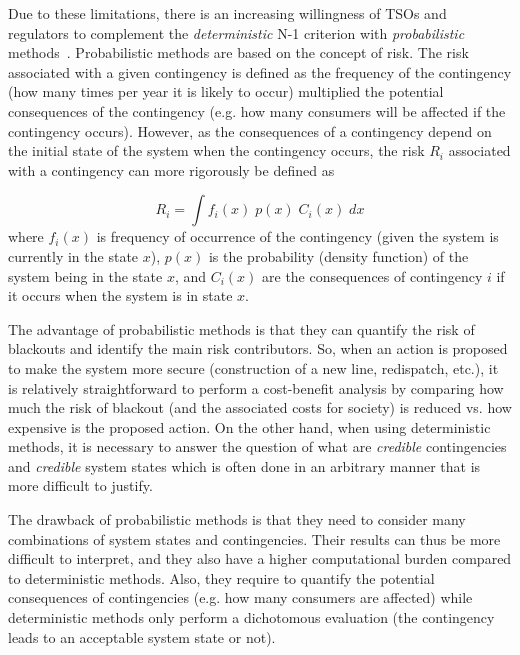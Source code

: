 Due to these limitations, there is an increasing willingness of TSOs and regulators to complement the \emph{deterministic} N-1 criterion with \emph{probabilistic} methods~\cite{ACER}. Probabilistic methods are based on the concept of risk. The risk associated with a given contingency is defined as the frequency of the contingency (how many times per year it is likely to occur) multiplied the potential consequences of the contingency (e.g. how many consumers will be affected if the contingency occurs). However, as the consequences of a contingency depend on the initial state of the system when the contingency occurs, the risk \(R_i\) associated with a contingency can more rigorously be defined as

\begin{equation}
    \label{eq:risk}
    {R_i = \int f_i(x) \; p(x) \; C_i(x) \; dx}
\end{equation}
\noindent where \(f_i(x)\) is frequency of occurrence of the contingency (given the system is currently in the state \(x\)), \(p(x)\) is the probability (density function) of the system being in the state \(x\), and \(C_i(x)\) are the consequences of contingency \(i\) if it occurs when the system is in state \(x\).

The advantage of probabilistic methods is that they can quantify the risk of blackouts and identify the main risk contributors. So, when an action is proposed to make the system more secure (construction of a new line, redispatch, etc.), it is relatively straightforward to perform a cost-benefit analysis by comparing how much the risk of blackout (and the associated costs for society) is reduced vs. how expensive is the proposed action. On the other hand, when using deterministic methods, it is necessary to answer the question of what are \emph{credible} contingencies and \emph{credible} system states which is often done in an arbitrary manner that is more difficult to justify.

The drawback of probabilistic methods is that they need to consider many combinations of system states and contingencies. Their results can thus be more difficult to interpret, and they also have a higher computational burden compared to deterministic methods. Also, they require to quantify the potential consequences of contingencies (e.g. how many consumers are affected) while deterministic methods only perform a dichotomous evaluation (the contingency leads to an acceptable system state or not).

